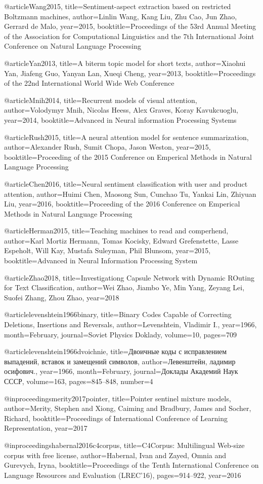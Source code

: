@article{Wang2015,
title={Sentiment-aspect extraction based on restricted Boltzmann machines},
author={Linlin Wang, Kang Liu, Zhu Cao, Jun Zhao, Gerrard de Malo},
year={2015},
booktitle={Proceedings of the 53rd Annual Meeting of the Association for Computational Linguistics and the 7th International Joint Conference on Natural Language Processing}
}

@article{Yan2013,
title={A biterm topic model for short texts},
author={Xiaohui Yan, Jiafeng Guo, Yanyan Lan, Xueqi Cheng},
year={2013},
booktitle={Proceedings of the 22nd International World Wide Web Conference}
}

@article{Mnih2014,
title={Recurrent models of visual attention},
author={Volodymyr Mnih, Nicolas Heess, Alex Graves, Koray Kavukcuoglu},
year={2014},
booktitle={Advanced in Neural information Processing Systems}
}

@article{Rush2015,
title={A neural attention model for sentence summarization},
author={Alexander Rush, Sumit Chopa, Jason Weston},
year={2015},
booktitle={Proceeding of the 2015 Conference on Emperical Methods in Natural Language Processing}
}

@article{Chen2016,
title={Neural sentiment classification with user and product attention},
author={Huimi Chen, Maosong Sun, Cunchao Tu, Yankai Lin, Zhiyuan Liu},
year={2016},
booktitle={Proceeding of the 2016 Conference on Emperical Methods in Natural Language Processing}
}

@article{Herman2015,
title={Teaching machines to read and comperhend},
author={Karl Mortiz Hermann, Tomas Kocisky, Edward Grefenstette, Lasse Espeholt, Will Kay, Mustafa Suleyman, Phil Blunsom},
year={2015},
booktitle={Advanced in Neural Information Processing System}
}

@article{Zhao2018,
title={Investigationg Capsule Network with Dynamic ROuting for Text Classification},
author={Wei Zhao, Jiambo Ye, Min Yang, Zeyang Lei, Suofei Zhang, Zhou Zhao},
year={2018}
}

@article{levenshtein1966binary,
title={Binary Codes Capable of Correcting Deletions, Insertions and Reversals},
author={Levenshtein, Vladimir I.},
year={1966},
month={February},
journal={Soviet Physics Doklady},
volume={10},
pages={709}
}

@article{levenshtein1966dvoichnie,
title={Двоичные коды с исправлением выпадений, вставок и замещений символов},
author={Левенштейн, {\CYRV}ладимир {\CYRI}осифович.},
year={1966},
month={February},
journal={Доклады Академий Наук СССР},
volume={163},
pages={845--848},
number={4}
}

@inproceedings{merity2017pointer,
  title={Pointer sentinel mixture models},
  author={Merity, Stephen and Xiong, Caiming and Bradbury, James and Socher, Richard},
  booktitle={Proceedings of International Conference of Learning Representation},
  year={2017}
}

@inproceedings{habernal2016c4corpus,
  title={C4Corpus: Multilingual Web-size corpus with free license},
  author={Habernal, Ivan and Zayed, Omnia and Gurevych, Iryna},
  booktitle={Proceedings of the Tenth International Conference on Language Resources and Evaluation (LREC'16)},
  pages={914--922},
  year={2016}
}